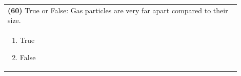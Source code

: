 \documentclass{article}
\begin{document}
\vspace{0.2cm}
\noindent\begin{tabular}{|p{0.9\linewidth}|}
\hline
\textbf{(60)} True or False: Gas particles are very far apart compared to their size.\\[0.2cm]

\begin{minipage}[t]{0.85\linewidth}
\begin{enumerate}[label=\alph*.]
\item True
\item False
\end{enumerate}
\end{minipage}\\[0.2cm]
\hline
\end{tabular}
\end{document}
